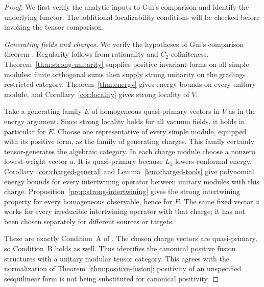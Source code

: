 \begin{proof}
We first verify the analytic inputs to Gui's comparison and identify
the underlying functor. The additional localizability conditions will be
checked before invoking the tensor comparison.

\smallskip
\noindent\emph{Generating fields and charges.}
We verify the hypotheses of Gui's comparison theorem
\cite[Section~3.4 and Corollary~3.23]{GuiUnbounded}.
Regularity follows from rationality and $C_2$-cofiniteness.
Theorem~\ref{thm:strong-unitarity} supplies positive invariant forms
on all simple modules; finite orthogonal sums then supply strong
unitarity on the grading-restricted category.
Theorem~\ref{thm:energy} gives energy bounds on every unitary module,
and Corollary~\ref{cor:locality} gives strong locality of $V$.

Take a generating family $E$ of homogeneous quasi-primary vectors in
$V$ as in the energy argument.  Since strong locality holds for all
vacuum fields, it holds in particular for $E$.
Choose one representative of every simple module, equipped with its
positive form, as the family of generating charges.  This family
certainly tensor-generates the algebraic category.  In each charge
module choose a nonzero lowest-weight vector $a$.  It is quasi-primary
because $L_1$ lowers conformal energy.
Corollary~\ref{cor:charged-general} and
Lemma~\ref{lem:charged-tools} give polynomial energy bounds for every
intertwining operator between unitary modules with this charge.
Proposition~\ref{prop:strong-intertwining} gives the strong
intertwining property for every homogeneous observable, hence for $E$.
The same fixed vector $a$ works for every irreducible intertwining
operator with that charge; it has not been chosen separately for
different sources or targets.

These are exactly Condition~A of \cite[Section~3.4]{GuiUnbounded}.
The chosen charge vectors are quasi-primary, so Condition~B holds as
well.  Thus \cite[Theorem~3.15]{GuiUnbounded} identifies the canonical
positive fusion structures with a unitary modular tensor category.
This agrees with the normalization of
Theorem~\ref{thm:positive-fusion}; positivity of an unspecified
sesquilinear form is not being substituted for canonical positivity.


\end{proof}

